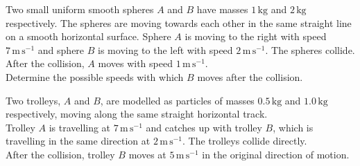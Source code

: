 \documentclass[leqno]{article}
\begin{document}
\djsFrontMatter
\begin{enumerate}[
  label=\textbf{\arabic*.},
  leftmargin=*,
  topsep=0pt,
  partopsep=0pt,
  parsep=0pt
]


\questionitem

\begin{figure}[H]
    \centering
{}
\end{figure}


Two small uniform smooth spheres $A$ and $B$ have masses $1\,\mathrm{kg}$ and $2\,\mathrm{kg}$ respectively. The spheres are moving towards each other in the same straight line on a smooth horizontal surface. Sphere $A$ is moving to the right with speed $7\,\mathrm{m\,s^{-1}}$ and sphere $B$ is moving to the left with speed $2\,\mathrm{m\,s^{-1}}$. The spheres collide. After the collision, $A$ moves with speed $1\,\mathrm{m\,s^{-1}}$. \\

Determine the possible speeds with which $B$ moves after the collision. 

\newpage

\questionitem

Two trolleys, $A$ and $B$, are modelled as particles of masses $0.5\,\mathrm{kg}$ and $1.0\,\mathrm{kg}$ respectively, moving along the same straight horizontal track. \\

Trolley $A$ is travelling at $7\,\mathrm{m}\,\mathrm{s}^{-1}$ and catches up with trolley $B$, which is travelling in the same direction at $2\,\mathrm{m}\,\mathrm{s}^{-1}$. The trolleys collide directly. \\

After the collision, trolley $B$ moves at $5\,\mathrm{m}\,\mathrm{s}^{-1}$ in the original direction of motion. \\


\end{enumerate}
\end{document}
